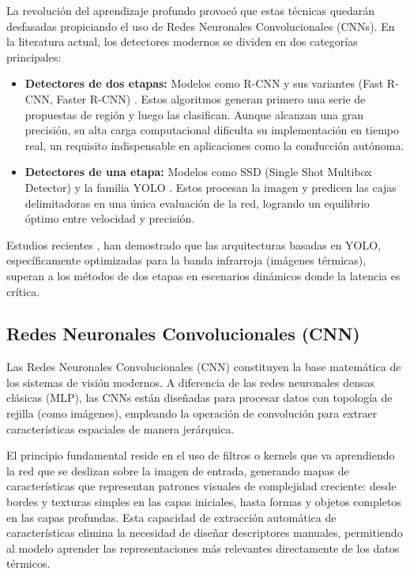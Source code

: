 \documentclass{article}
\begin{document}
	
	La revolución del aprendizaje profundo provocó que estas técnicas quedarán desfasadas propiciando el uso de Redes Neuronales Convolucionales (CNNs). En la literatura actual, los detectores modernos se dividen en dos categorías principales: 
	\begin{itemize} 
		\item \textbf{Detectores de dos etapas:} Modelos como R-CNN y sus variantes (Fast R-CNN, Faster R-CNN) \cite{ren2015faster}. Estos algoritmos generan primero una serie de propuestas de región y luego las clasifican. Aunque alcanzan una gran precisión, su alta carga computacional dificulta su implementación en tiempo real, un requisito indispensable en aplicaciones como la conducción autónoma. 
		\item \textbf{Detectores de una etapa:} Modelos como SSD (Single Shot Multibox Detector) \cite{liu2016ssd} y la familia YOLO \cite{redmon2016lookonceunifiedrealtime}. Estos procesan la imagen y predicen las cajas delimitadoras en una única evaluación de la red, logrando un equilibrio óptimo entre velocidad y precisión.		
	\end{itemize}
	
	Estudios recientes \cite{jiang2022object}, han demostrado que las arquitecturas basadas en YOLO, específicamente optimizadas para la banda infrarroja (imágenes térmicas), superan a los métodos de dos etapas en escenarios dinámicos donde la latencia es crítica.
	
	\subsection{Redes Neuronales Convolucionales (CNN)} 
	Las Redes Neuronales Convolucionales (CNN) constituyen la base matemática de los sistemas de visión modernos. A diferencia de las redes neuronales densas clásicas (MLP), las CNNs están diseñadas para procesar datos con topología de rejilla (como imágenes), empleando la operación de convolución para extraer características espaciales de manera jerárquica.
	\newpage
	
	El principio fundamental reside en el uso de filtros o kernels que va aprendiendo la red que se deslizan sobre la imagen de entrada, generando mapas de características que representan patrones visuales de complejidad creciente: desde bordes y texturas simples en las capas iniciales, hasta formas y objetos completos en las capas profundas. Esta capacidad de extracción automática de características elimina la necesidad de diseñar descriptores manuales, permitiendo al modelo aprender las representaciones más relevantes directamente de los datos térmicos.
	
\end{document}
